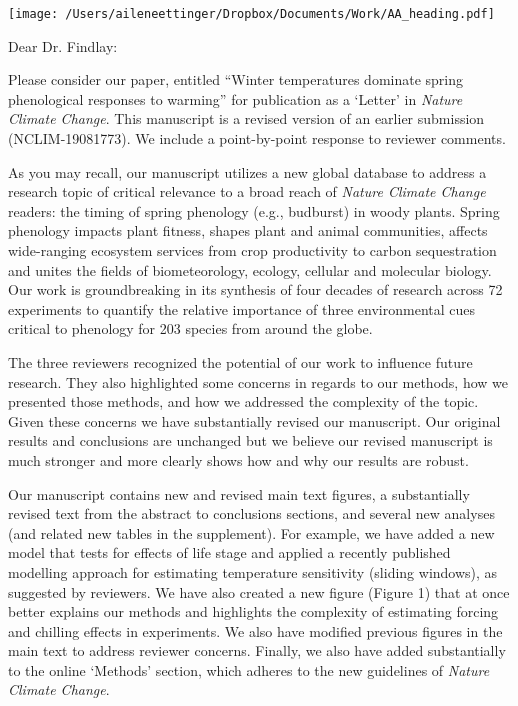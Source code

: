 \documentclass[11.5pt,a4paper]{letter}
\begin{document}
\begin{letter}{}
\texttt{[image: /Users/aileneettinger/Dropbox/Documents/Work/AA\_heading.pdf]}

\opening{Dear Dr. Findlay:}
Please consider our paper, entitled ``Winter temperatures dominate spring phenological responses to warming'' for publication as a `Letter' in \emph{Nature Climate Change}. This manuscript is a revised version of an earlier submission (NCLIM-19081773). We include a point-by-point response to reviewer comments. 

\par As you may recall, our manuscript utilizes a new global database to address a research topic of critical relevance to a broad reach of \emph{Nature Climate Change} readers:  the timing of spring phenology (e.g., budburst) in woody plants. Spring phenology impacts plant fitness, shapes plant and animal communities, affects wide-ranging ecosystem services from crop productivity to carbon sequestration and unites the fields of biometeorology, ecology, cellular and molecular biology. Our work is groundbreaking in its synthesis of four decades of research across 72 experiments to quantify the relative importance of three environmental cues critical to phenology for 203 species from around the globe. 

\par The three reviewers recognized the potential of our work to influence future research. They also highlighted some concerns in regards to our methods, how we presented those methods, and how we addressed the complexity of the topic. Given these concerns we have substantially revised our manuscript. Our original results and conclusions are unchanged but we believe our revised manuscript is much stronger and more clearly shows how and why our results are robust.

\par Our manuscript contains new and revised main text figures, a substantially revised text from the abstract to conclusions sections, and several new analyses (and related new tables in the supplement). For example, we have added a new model that tests for effects of life stage and applied a recently published modelling approach for estimating temperature sensitivity (sliding windows), as suggested by reviewers. We have also created a new figure (Figure 1) that at once better explains our methods and highlights the complexity of estimating forcing and chilling effects in experiments. We also have modified previous figures in the main text to address reviewer concerns. Finally, we also have added substantially to the online `Methods' section, which adheres to the new guidelines of \emph{Nature Climate Change}. 


\end{letter}
\end{document}

